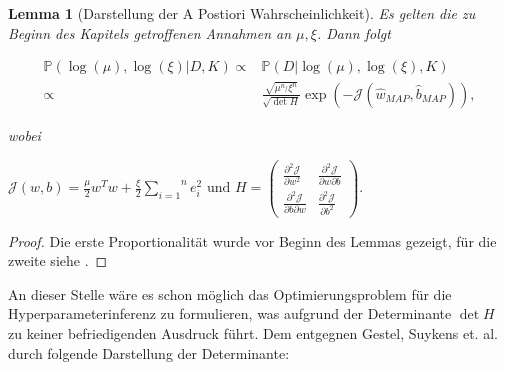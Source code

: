 \documentclass{report}
\theoremstyle{linebreak}
\newtheorem{lemma}[defi]{Lemma}
\begin{document}
\begin{lemma}[Darstellung der A Postiori Wahrscheinlichkeit]

Es gelten die zu Beginn des Kapitels getroffenen Annahmen an $\mu, \xi$. Dann folgt

\begin{align*}
	\mathbb{P}(\log(\mu), \log(\xi)\vert D, K) \propto & \mathbb{P}(D\vert \log(\mu),			\log(\xi),K) \\
	\propto & \frac{\sqrt{\mu^{n_f} \xi^n}}	{\sqrt{\det H}} \exp(- \mathcal{J}(\hat{w}			_{MAP},\hat{b}_{MAP})),
\end{align*}

wobei 
\begin{center}
	$\mathcal{J}(w,b) = \frac{\mu}{2}w^T w + \frac{\xi}{2}\overset{n}{\underset{i=1}			{\sum}} e_i ^2 \text{ und } H = \begin{pmatrix}
	\frac{\partial^2 \mathcal{J}}{\partial w^2 } & \frac{\partial^2 \mathcal{J}}				{\partial w \partial b } \\
	\frac{\partial^2 \mathcal{J}}{\partial b \partial w } & \frac{\partial^2 					\mathcal{J}}{\partial b^2 }
	\end{pmatrix}.$
\end{center}

\end{lemma}

\begin{proof}
Die erste Proportionalität wurde vor Beginn des Lemmas gezeigt, für die zweite siehe \cite{LS-SVM}.
\end{proof}

An dieser Stelle wäre es schon möglich das Optimierungsproblem für die Hyperparameterinferenz zu formulieren, was aufgrund der Determinante $\det H$ zu keiner befriedigenden Ausdruck führt. Dem entgegnen Gestel, Suykens et. al. durch folgende Darstellung der Determinante:
\end{document}
